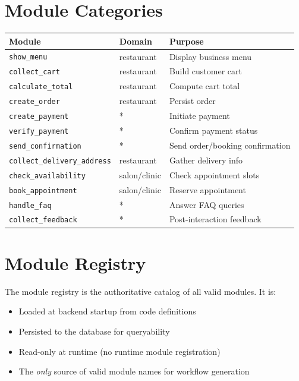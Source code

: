 \documentclass[12pt, a4paper]{report}
\begin{document}
\section{Module Categories}

\begin{longtable}{lll}
\toprule
\textbf{Module} & \textbf{Domain} & \textbf{Purpose} \\
\midrule
\texttt{show\_menu} & restaurant & Display business menu \\
\texttt{collect\_cart} & restaurant & Build customer cart \\
\texttt{calculate\_total} & restaurant & Compute cart total \\
\texttt{create\_order} & restaurant & Persist order \\
\texttt{create\_payment} & * & Initiate payment \\
\texttt{verify\_payment} & * & Confirm payment status \\
\texttt{send\_confirmation} & * & Send order/booking confirmation \\
\texttt{collect\_delivery\_address} & restaurant & Gather delivery info \\
\texttt{check\_availability} & salon/clinic & Check appointment slots \\
\texttt{book\_appointment} & salon/clinic & Reserve appointment \\
\texttt{handle\_faq} & * & Answer FAQ queries \\
\texttt{collect\_feedback} & * & Post-interaction feedback \\
\bottomrule
\end{longtable}

\section{Module Registry}

The module registry is the authoritative catalog of all valid modules. It is:
\begin{itemize}
  \item Loaded at backend startup from code definitions
  \item Persisted to the database for queryability
  \item Read-only at runtime (no runtime module registration)
  \item The \textit{only} source of valid module names for workflow generation
\end{itemize}
\end{document}
